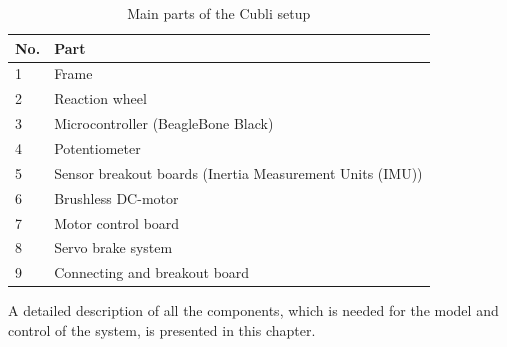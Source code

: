 %
\begin{table}[H]
	\begin{tabular}{|l|p{6.7cm}|}
		\hline %
		\textbf{No.} &\textbf{Part} 			\\
		\hline %
		1            & Frame           			\\
		\hline %
		2            & Reaction wheel      		\\
		\hline %
		3            & Microcontroller (BeagleBone Black)  \\
		\hline %
		4            & Potentiometer			\\
		\hline %
		5            & Sensor breakout boards (Inertia Measurement Units (IMU))       			\\
		\hline %
		6            & Brushless DC-motor   	\\
		\hline %
		7            & Motor control board     	\\
		\hline %
		8            & Servo brake system 		    	\\
		\hline %
		9            & Connecting and breakout board		    	\\
		\hline %
	\end{tabular}
	\caption{Main parts of the Cubli setup}
\label{TableAAUCubliComponent}
\end{table}

A detailed description of all the components, which is needed for the model and control of the system, is presented in this chapter.

